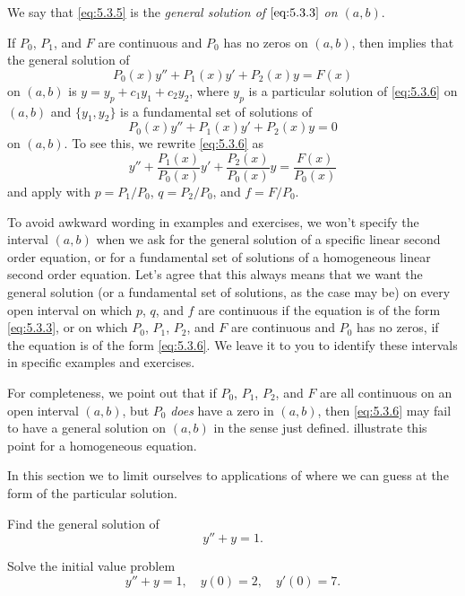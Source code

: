 We say that \eqref{eq:5.3.5} is the \emph{\color{blue}general solution of
$\eqref{eq:5.3.3}$ on $(a,b)$}.


If $P_0$, $P_1$, and $F$ are continuous and $P_0$ has no zeros on
$(a,b)$, then  implies that the general
solution of
\begin{equation} \label{eq:5.3.6}
P_0(x)y''+P_1(x)y'+P_2(x)y=F(x)
\end{equation}
on  $(a,b)$ is $y=y_p+c_1y_1+c_2y_2$, where $y_p$ is a particular
solution  of \eqref{eq:5.3.6} on $(a,b)$ and  $\{y_1,y_2\}$ is a
fundamental set of solutions of
\[
P_0(x)y''+P_1(x)y'+P_2(x)y=0
\]
on $(a,b)$. To see this, we rewrite \eqref{eq:5.3.6} as
\[
y''+\frac{P_1(x)}{P_0(x)}y'+\frac{P_2(x)}{P_0(x)}y=\frac{F(x)}{P_0(x)}
\]
and apply  with $p=P_1/P_0$, $q=P_2/P_0$, and
$f=F/P_0$.


To avoid awkward wording in examples and exercises, we won't specify
the interval $(a,b)$ when we ask for the general solution of a
specific linear second order equation, or for a fundamental set of
solutions of a homogeneous linear second order equation. Let's agree
that this always means that we want the general solution (or a
fundamental set of solutions, as the case may be) on every open
interval on which $p$, $q$, and $f$ are continuous if the equation is
of the form \eqref{eq:5.3.3}, or on which $P_0$, $P_1$, $P_2$, and $F$ are
continuous and $P_0$ has no zeros, if the equation is of the form
\eqref{eq:5.3.6}. We leave it to you to identify these intervals in
specific examples and exercises.

For completeness, we point out that if $P_0$, $P_1$, $P_2$, and $F$ are
all continuous on an open interval $(a,b)$, but $P_0$ \emph{\color{blue}does}
have a zero in $(a,b)$, then \eqref{eq:5.3.6} may fail to have a general
solution on $(a,b)$ in the sense just defined.
illustrate this point for a homogeneous equation.


In this section we to limit ourselves to applications of
 where we can guess at the form of the
particular solution.

\begin{example}\label{example:5.3.1}
\begin{alist}
\item %
Find the general solution of
\begin{equation} \label{eq:5.3.7}
y''+y=1.
\end{equation}
\item %
Solve the initial value problem
\begin{equation} \label{eq:5.3.8}
y''+y=1, \quad  y(0)=2,\quad y'(0)=7.
\end{equation}
\end{alist}
\end{example}

